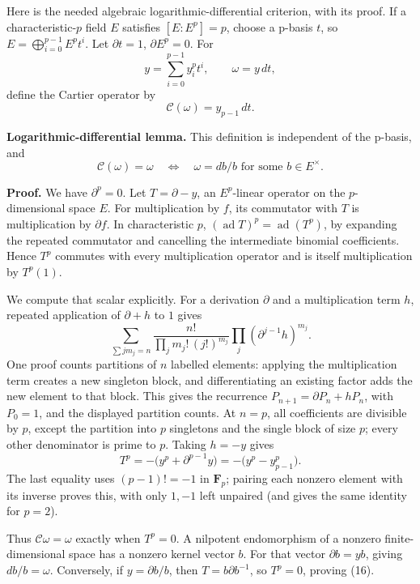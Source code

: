 \documentclass[11pt,a4paper]{article}
\begin{document}
Here is the needed algebraic logarithmic-differential criterion, with
its proof. If a characteristic-\(p\) field \(E\) satisfies
\([E:E^p]=p\), choose a p-basis \(t\), so
\(E=\bigoplus_{i=0}^{p-1}E^p t^i\). Let \(\partial t=1\),
\(\partial E^p=0\). For \[
y=\sum_{i=0}^{p-1}y_i^p t^i,
\qquad \omega=y\,dt,
\] define the Cartier operator by \[
\mathcal C(\omega)=y_{p-1}\,dt.
\tag{15}
\]

\textbf{Logarithmic-differential lemma.} This definition is independent
of the p-basis, and \[
\mathcal C(\omega)=\omega\quad\Longleftrightarrow\quad
\omega=db/b\text{ for some }b\in E^\times.
\tag{16}
\]

\textbf{Proof.} We have \(\partial^p=0\). Let \(T=\partial-y\), an
\(E^p\)-linear operator on the \(p\)-dimensional space \(E\). For
multiplication by \(f\), its commutator with \(T\) is multiplication by
\(\partial f\). In characteristic \(p\),
\((\operatorname{ad}T)^p=\operatorname{ad}(T^p)\), by expanding the
repeated commutator and cancelling the intermediate binomial
coefficients. Hence \(T^p\) commutes with every multiplication operator
and is itself multiplication by \(T^p(1)\).

We compute that scalar explicitly. For a derivation \(\partial\) and a
multiplication term \(h\), repeated application of \(\partial+h\) to
\(1\) gives \[
\sum_{\sum j m_j=n}
\frac{n!}{\prod_j m_j!\,(j!)^{m_j}}
\prod_j(\partial^{j-1}h)^{m_j}.
\tag{17}
\] One proof counts partitions of \(n\) labelled elements: applying the
multiplication term creates a new singleton block, and differentiating
an existing factor adds the new element to that block. This gives the
recurrence \(P_{n+1}=\partial P_n+hP_n\), with \(P_0=1\), and the
displayed partition counts. At \(n=p\), all coefficients are divisible
by \(p\), except the partition into \(p\) singletons and the single
block of size \(p\); every other denominator is prime to \(p\). Taking
\(h=-y\) gives \[
T^p=-\bigl(y^p+\partial^{p-1}y\bigr)
=-\bigl(y^p-y_{p-1}^p\bigr).
\tag{18}
\] The last equality uses \((p-1)!=-1\) in \(\mathbf F_p\); pairing each
nonzero element with its inverse proves this, with only \(1,-1\) left
unpaired (and gives the same identity for \(p=2\)).

Thus \(\mathcal C\omega=\omega\) exactly when \(T^p=0\). A nilpotent
endomorphism of a nonzero finite-dimensional space has a nonzero kernel
vector \(b\). For that vector \(\partial b=yb\), giving \(db/b=\omega\).
Conversely, if \(y=\partial b/b\), then \(T=b\partial b^{-1}\), so
\(T^p=0\), proving (16).
\end{document}
